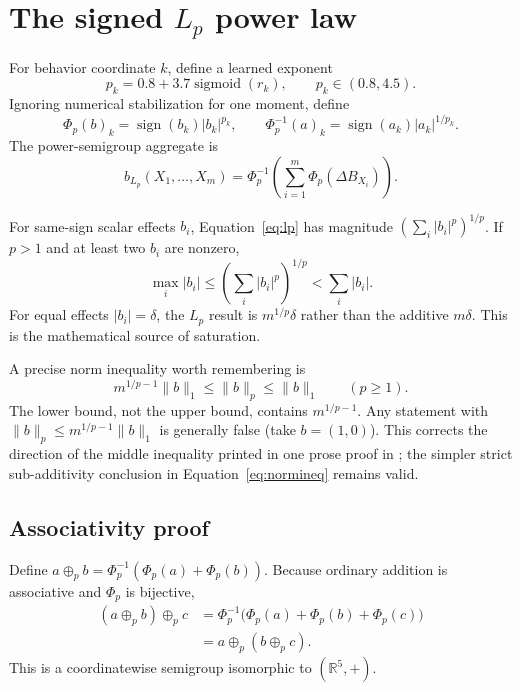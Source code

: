 \documentclass[11pt,a4paper]{article}
\newcommand{\R}{\mathbb{R}}
\newcommand{\dB}{\Delta B}
\newcommand{\sigmoid}{\operatorname{sigmoid}}
\newcommand{\sign}{\operatorname{sign}}
\begin{document}
\section{The signed $L_p$ power law}

For behavior coordinate $k$, define a learned exponent
\begin{equation}
p_k=0.8+3.7\sigmoid(r_k),
\qquad p_k\in(0.8,4.5).
\label{eq:p}
\end{equation}
Ignoring numerical stabilization for one moment, define
\begin{equation}
\Phi_p(b)_k=\sign(b_k)|b_k|^{p_k},
\qquad
\Phi_p^{-1}(a)_k=\sign(a_k)|a_k|^{1/p_k}.
\end{equation}
The power-semigroup aggregate is
\begin{equation}
b_{L_p}(X_1,\ldots,X_m)=
\Phi_p^{-1}\!\left(\sum_{i=1}^m\Phi_p(\dB_{X_i})\right).
\label{eq:lp}
\end{equation}

For same-sign scalar effects $b_i$, Equation~\eqref{eq:lp} has magnitude
$(\sum_i|b_i|^p)^{1/p}$.  If $p>1$ and at least two $b_i$ are nonzero,
\begin{equation}
\max_i|b_i|\le \left(\sum_i|b_i|^p\right)^{1/p}
<\sum_i|b_i|.
\label{eq:normineq}
\end{equation}
For equal effects $|b_i|=\delta$, the $L_p$ result is $m^{1/p}\delta$ rather
than the additive $m\delta$.  This is the mathematical source of saturation.

A precise norm inequality worth remembering is
\begin{equation}
m^{1/p-1}\|b\|_1\le \|b\|_p\le \|b\|_1
\qquad (p\ge1).
\label{eq:correctnorm}
\end{equation}
The lower bound, not the upper bound, contains $m^{1/p-1}$.  Any statement with
$\|b\|_p\le m^{1/p-1}\|b\|_1$ is generally false (take $b=(1,0)$).  This
corrects the direction of the middle inequality printed in one prose proof in
; the simpler strict sub-additivity conclusion in
Equation~\eqref{eq:normineq} remains valid.

\subsection{Associativity proof}

Define $a\oplus_p b=\Phi_p^{-1}(\Phi_p(a)+\Phi_p(b))$.  Because ordinary
addition is associative and $\Phi_p$ is bijective,
\begin{align}
(a\oplus_p b)\oplus_p c
&=\Phi_p^{-1}\big(\Phi_p(a)+\Phi_p(b)+\Phi_p(c)\big)\\
&=a\oplus_p(b\oplus_p c).
\end{align}
This is a coordinatewise semigroup isomorphic to $(\R^5,+)$.
\end{document}
